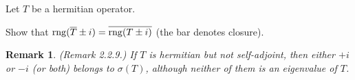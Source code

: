 \documentclass{article}
\theoremstyle{exercisestyle}
\newenvironment{exercise}[1]
  {\renewcommand\theinnerex{#1}\innerex}
  {\endinnerex}
\newtheorem{remark}{Remark}[subsection]
\newcommand{\closure}[1]{\overline{ #1}}
\begin{document}
\begin{exercise}{2.2.8}
    
    Let $T$ be a hermitian operator. 
    
    Show that $\rng (\closure{T} \pm i) = \closure{\rng (T \pm i)}$ (the bar denotes closure).




\end{exercise}

\begin{remark}(Remark 2.2.9.)
    If $T$ is hermitian but not self-adjoint, then either $+i$ or $-i$ (or both) belongs to $\sigma(T )$, although neither of them is an eigenvalue of $T$.
\end{remark}
\end{document}
